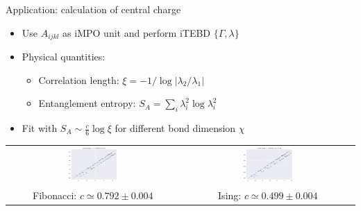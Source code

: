 \documentclass{fdubeamer}
\newcommand{\1}{\mathbb{1}}
\begin{document}
\begin{frame}{Application: calculation of central charge}

\begin{itemize}
  \item Use $A_{ijkl}$ as iMPO unit and perform iTEBD \textrightarrow{} $\{\Gamma,\lambda\}$
  \item Physical quantities:

    \begin{itemize}
      \item Correlation length: $\xi = -1 / \log|\lambda_2/\lambda_1|$
      \item Entanglement entropy: $S_{\!A} = \sum_i \lambda_i^2 \log \lambda_i^2$
    \end{itemize}

  \item Fit with $S_{\!A} \sim \frac{c}{6} \log \xi$ for different bond dimension $\chi$
\end{itemize}

\begin{center}
  \scriptsize
  \begin{tabular}{cc}
    \includegraphics[width=0.3\textwidth]{images/fib-central-charge.png} &
    \includegraphics[width=0.3\textwidth]{images/ising-central-charge.png} \\
    Fibonacci: $c \simeq 0.792 \pm 0.004$ &
    Ising:     $c \simeq 0.499 \pm 0.004$
  \end{tabular}
\end{center}

\end{frame}
\end{document}
